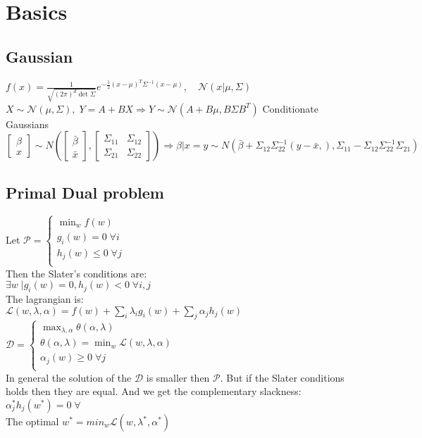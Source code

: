 \section{Basics}

\subsection*{Gaussian}
$f(x) = \frac{1}{\sqrt{(2\pi)^d\det\Sigma}} e^{- \frac{1}{2} (x-\mu)^T \Sigma^{-1} (x-\mu)},\quad \mathcal{N}(x|\mu, \Sigma)$\\
$X {\sim} \mathcal{N}(\mu,\Sigma),\;Y{=}A{+}BX \Rightarrow Y{\sim}\mathcal{N}(A{+}B\mu,B\Sigma B^T)$ 
Conditionate Gaussians\\
\(
\begin{bmatrix} \beta \\ x \end{bmatrix} \sim N\left(\begin{bmatrix}\bar{\beta} \\ \bar{x}\end{bmatrix},\begin{bmatrix} \Sigma_{11}&\Sigma_{12} \\\Sigma_{21}&\Sigma_{22} \end{bmatrix}\right)
\Rightarrow\beta\vert x=y \sim N\left(\bar{\beta} + \Sigma_{12}\Sigma^{-1}_{22}(y-\bar{x}, ) , \Sigma_{11}-\Sigma_{12}\Sigma^{-1}_{22}\Sigma_{21}\right)
\)

\subsection*{Primal Dual problem}
Let \(\mathcal{P} = 
	\begin{cases}
		\min_w f(w)\\
		g_i(w)=0\;\forall i\\
		h_j(w)\leq 0\;\forall j\\
	\end{cases}
	\)\\
Then the Slater's conditions are:\\
\(\exists w\; \vert g_i(w) = 0, h_j (w) < 0 \;\forall i,j\)\\
The lagrangian is:\\
\(\mathcal{L}(w,\lambda,\alpha)=f(w) + \sum_i\lambda_ig_i(w) + \sum_j \alpha_jh_j(w)\)\\
\(\mathcal{D} = 	
\begin{cases}
	\max_{\lambda,\alpha} \theta(\alpha, \lambda)\\
	\theta(\alpha, \lambda) = \min_w \mathcal{L}(w,\lambda,\alpha)\\
	\alpha_j(w)\geq 0\;\forall j\\
\end{cases}
\)\\
In general the solution of the \(\mathcal{D}\) is smaller then $\mathcal{P}$. But if the Slater conditions holds then they are equal. And we get the complementary slackness: \(\alpha_j^*h_j(w^*) = 0\;\forall\) \\
 The optimal $w^{*} = min_w {\mathcal{L}(w,\lambda^*,\alpha^*)}$

